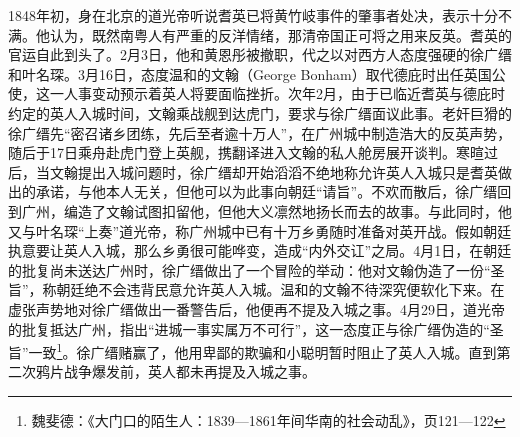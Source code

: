 1848年初，身在北京的道光帝听说耆英已将黄竹岐事件的肇事者处决，表示十分不满。他认为，既然南粤人有严重的反洋情绪，那清帝国正可将之用来反英。耆英的官运自此到头了。2月3日，他和黄恩彤被撤职，代之以对西方人态度强硬的徐广缙和叶名琛。3月16日，态度温和的文翰（George Bonham）取代德庇时出任英国公使，这一人事变动预示着英人将要面临挫折。次年2月，由于已临近耆英与德庇时约定的英人入城时间，文翰乘战舰到达虎门，要求与徐广缙面议此事。老奸巨猾的徐广缙先“密召诸乡团练，先后至者逾十万人”，在广州城中制造浩大的反英声势，随后于17日乘舟赴虎门登上英舰，携翻译进入文翰的私人舱房展开谈判。寒暄过后，当文翰提出入城问题时，徐广缙却开始滔滔不绝地称允许英人入城只是耆英做出的承诺，与他本人无关，但他可以为此事向朝廷“请旨”。不欢而散后，徐广缙回到广州，编造了文翰试图扣留他，但他大义凛然地扬长而去的故事。与此同时，他又与叶名琛“上奏”道光帝，称广州城中已有十万乡勇随时准备对英开战。假如朝廷执意要让英人入城，那么乡勇很可能哗变，造成“内外交讧”之局。4月1日，在朝廷的批复尚未送达广州时，徐广缙做出了一个冒险的举动：他对文翰伪造了一份“圣旨”，称朝廷绝不会违背民意允许英人入城。温和的文翰不待深究便软化下来。在虚张声势地对徐广缙做出一番警告后，他便再不提及入城之事。4月29日，道光帝的批复抵达广州，指出“进城一事实属万不可行”，这一态度正与徐广缙伪造的“圣旨”一致\footnote{魏斐德：《大门口的陌生人：1839—1861年间华南的社会动乱》，页121—122}。徐广缙赌赢了，他用卑鄙的欺骗和小聪明暂时阻止了英人入城。直到第二次鸦片战争爆发前，英人都未再提及入城之事。

